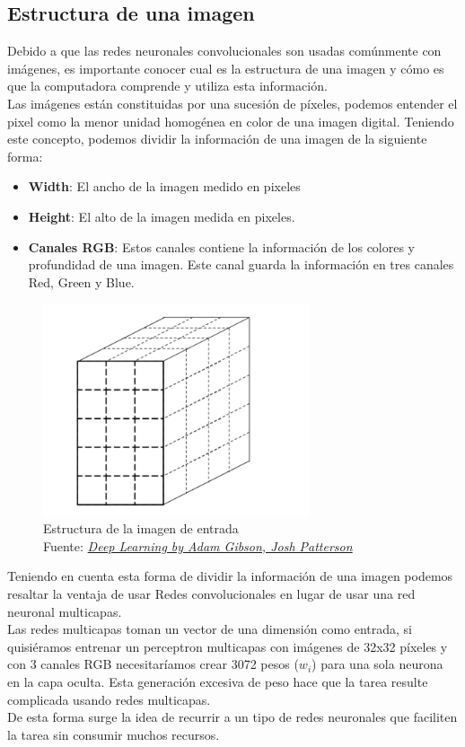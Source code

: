 \subsection{Estructura de una imagen}
Debido a que las redes neuronales convolucionales son usadas comúnmente con imágenes, es importante conocer cual es la estructura de una imagen y cómo es que la computadora comprende y utiliza esta información.\\
Las imágenes están constituidas por una sucesión de píxeles, podemos entender el pixel como la menor unidad homogénea en color de una imagen digital. Teniendo este concepto, podemos dividir la información de una imagen de la siguiente forma:
\begin{itemize}
	\item \textbf{Width}: El ancho de la imagen medido en pixeles
	\item \textbf{Height}: El alto de la imagen medida en pixeles.
	\item \textbf{Canales RGB}: Estos canales contiene la información de los colores y profundidad de una imagen. Este canal guarda la información en tres canales Red, Green y Blue.
\end{itemize}

\begin{figure}[H]
	\centering
	\includegraphics[width=0.7\textwidth]{Figures/image.png}
	\caption{Estructura de la imagen de entrada \\ Fuente:  \href{https://www.safaribooksonline.com/library/view/deep-learning/9781491924570/ch04.html}{\textit{Deep Learning by Adam Gibson, Josh Patterson}}}
	\label{image}
\end{figure} 

Teniendo en cuenta esta forma de dividir la información de una imagen podemos resaltar la ventaja de usar Redes convolucionales en lugar de usar una red neuronal multicapas.\\ Las redes multicapas toman un vector de una dimensión como entrada, si quisiéramos entrenar un perceptron multicapas con imágenes de 32x32 píxeles y con 3 canales RGB necesitaríamos crear 3072 pesos ($w_{i}$) para una sola neurona en la capa oculta. Esta generación excesiva de peso hace que la tarea resulte complicada usando redes multicapas.\\ De esta forma surge la idea de recurrir a un tipo de redes neuronales que faciliten la tarea sin consumir muchos recursos.
